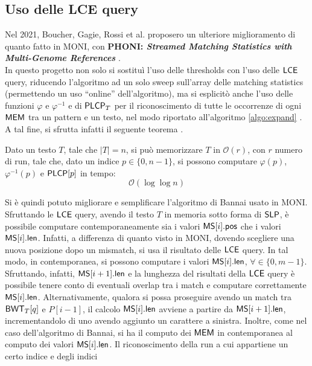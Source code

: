 \subsection{Uso delle LCE query}
Nel 2021, Boucher, Gagie, Rossi et al. proposero un ulteriore miglioramento di
quanto fatto in MONI, con \textbf{PHONI: \textit{Streamed Matching
    Statistics with Multi-Genome References}} \cite{phoni}.\\
In questo progetto non solo si sostituì l'uso delle thresholds con
l'uso delle $\mbox{\rm {\sf LCE}}$ query, riducendo l'algoritmo ad un solo sweep
sull'array delle matching statistics (permettendo un uso ``online''
dell'algoritmo), ma si 
esplicitò anche l'uso delle funzioni $\varphi$ e
$\varphi^{-1}$ e di $\mbox{\rm {\sf PLCP}}_T$ per il riconoscimento di tutte le
occorrenze di ogni $\mbox{\rm {\sf MEM}}$ tra un pattern e un testo, nel modo 
riportato all'algoritmo \ref{algo:expand} \cite{phoni}.\\
A tal fine, si sfrutta infatti il seguente teorema \cite{gagie2020}.
\begin{teorema}
  Dato un testo $T$, tale che $|T|=n$, si può memorizzare $T$ in
  $\mathcal{O}(r)$, con $r$ numero di run, tale che, dato un indice
  $p\in\{0,n-1\}$, si possono computare $\varphi(p)$, $\varphi^{-1}(p)$ e
  $\mbox{\rm {\sf PLCP}}[p]$ in tempo:
  \begin{equation}
    \label{eq:rlpbwt9}
    \mathcal{O}(\log\log n)
  \end{equation}
\end{teorema}
Si è quindi potuto migliorare e semplificare l'algoritmo di Bannai
usato in MONI. Sfruttando le
$\mbox{\rm {\sf LCE}}$ query, avendo il testo $T$ in memoria sotto forma di $\mbox{\rm {\sf SLP}}$,
è possibile computare contemporaneamente sia i valori
$\mbox{\rm {\sf MS}}[i].\mbox{\rm {\sf pos}}$ che i valori $\mbox{\rm {\sf MS}}[i].\mbox{\rm {\sf len}}$. Infatti, a differenza di quanto visto
in MONI, dovendo scegliere una nuova posizione dopo un mismatch, 
si usa il 
risultato delle $\mbox{\rm {\sf LCE}}$ query. In tal modo, in contemporanea,
si possono computare i valori 
$\mbox{\rm {\sf MS}}[i].\mbox{\rm {\sf len}}$, $\forall \in \{0,m-1\}$. Sfruttando, infatti, $\mbox{\rm {\sf MS}}[i+1].\mbox{\rm {\sf len}}$ e
la lunghezza del risultati 
della $\mbox{\rm {\sf LCE}}$ query è possibile tenere conto di eventuali overlap tra i
match e computare correttamente $\mbox{\rm {\sf MS}}[i].\mbox{\rm {\sf len}}$. Alternativamente, qualora si possa
proseguire avendo un match tra  
$\mbox{\rm {\sf BWT}}_T[q]$ e $P[i-1]$, il calcolo $\mbox{\rm {\sf MS}}[i].\mbox{\rm {\sf len}}$ avviene a partire da
$\mbox{\rm {\sf MS}}[i+1].\mbox{\rm {\sf len}}$, incrementandolo di uno avendo aggiunto un carattere a sinistra.
Inoltre, come nel caso dell'algoritmo
di Bannai, si ha il computo dei $\mbox{\rm {\sf MEM}}$ in contemporanea al computo dei valori 
$\mbox{\rm {\sf MS}}[i].\mbox{\rm {\sf len}}$.
Il riconoscimento della run a cui appartiene un certo indice e degli indici
